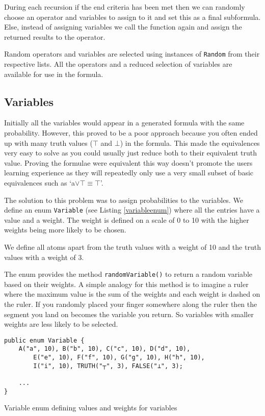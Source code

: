 \documentclass{report}
\begin{document}
During each recursion if the end criteria has been met then we can randomly choose an operator and variables to assign to it and set this as a final subformula. Else, instead of assigning variables we call the function again and assign the returned results to the operator.

Random operators and variables are selected using instances of {\tt Random} from their respective lists. All the operators and a reduced selection of variables are available for use in the formula.

\subsection{Variables}
\label{sub:variables}

Initially all the variables would appear in a generated formula with the same probability. However, this proved to be a poor approach because you often ended up with many truth values ($\top$ and $\bot$) in the formula. This made the equivalences very easy to solve as you could usually just reduce both to their equivalent truth value. Proving the formulae were equivalent this way doesn't promote the users learning experience as they will repeatedly only use a very small subset of basic equivalences such as `a$\lor\top \equiv \top$'.

The solution to this problem was to assign probabilities to the variables. We define an enum {\tt Variable} (see Listing \ref{variableenum}) where all the entries have a value and a weight. The weight is defined on a scale of 0 to 10 with the higher weights being more likely to be chosen.

We define all atoms apart from the truth values with a weight of 10 and the truth values with a weight of 3.

The enum provides the method {\tt randomVariable()} to return a random variable based on their weights. A simple analogy for this method is to imagine a ruler where the maximum value is the sum of the weights and each weight is dashed on the ruler. If you randomly placed your finger somewhere along the ruler then the segment you land on becomes the variable you return. So variables with smaller weights are less likely to be selected.

\begin{listing}[ht]
\begin{verbatim}
public enum Variable {
    A("a", 10), B("b", 10), C("c", 10), D("d", 10), 
        E("e", 10), F("f", 10), G("g", 10), H("h", 10), 
        I("i", 10), TRUTH("┬", 3), FALSE("⊥", 3);

    ...
}
\end{verbatim}
\caption{Variable enum defining values and weights for variables}
\label{variableenum}
\end{listing}
\end{document}
